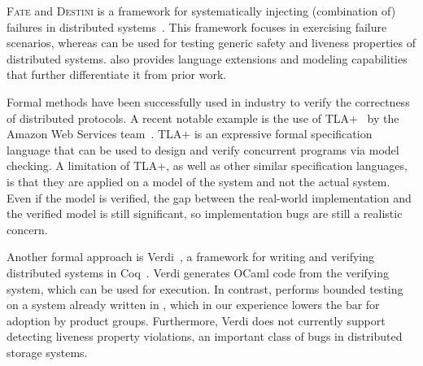 \textsc{Fate} and \textsc{Destini} is a framework for systematically injecting (combination of) failures in distributed systems~\cite{gunawi2011fate}. This framework focuses in exercising failure scenarios, whereas \psharp can be used for testing generic safety and liveness properties of distributed systems. \psharp also provides language extensions and modeling capabilities that further differentiate it from prior work.

Formal methods have been successfully used in industry to verify the correctness of distributed protocols. A recent notable example is the use of TLA+~\cite{lamport1994temporal} by the Amazon Web Services team~\cite{newcombe2015aws}. TLA+ is an expressive formal specification language that can be used to design and verify concurrent programs via model checking. A limitation of TLA+, as well as other similar specification languages, is that they are applied on a model of the system and not the actual system. Even if the model is verified, the gap between the real-world implementation and the verified model is still significant, so implementation bugs are still a realistic concern.

Another formal approach is Verdi~\cite{wilcox2015verdi}, a framework for writing and verifying distributed systems in Coq~\cite{barras1997coq}. Verdi generates OCaml code from the verifying system, which can be used for execution. In contrast, \psharp performs bounded testing on a system already written in \csharp, which in our experience lowers the bar for adoption by product groups. Furthermore, Verdi does not currently support detecting liveness property violations, an important class of bugs in distributed storage systems.
